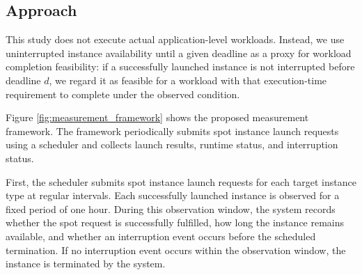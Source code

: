 \documentclass[runningheads]{llncs}
\begin{document}


\subsection{Approach}

This study does not execute actual application-level workloads. Instead, we use uninterrupted instance availability until a given deadline as a proxy for workload completion feasibility: if a successfully launched instance is not interrupted before deadline $d$, we regard it as feasible for a workload with that execution-time requirement to complete under the observed condition.

Figure \ref{fig:measurement_framework} shows the proposed measurement framework. The framework periodically submits spot instance launch requests using a scheduler and collects launch results, runtime status, and interruption status.

First, the scheduler submits spot instance launch requests for each target instance type at regular intervals. Each successfully launched instance is observed for a fixed period of one hour. During this observation window, the system records whether the spot request is successfully fulfilled, how long the instance remains available, and whether an interruption event occurs before the scheduled termination. If no interruption event occurs within the observation window, the instance is terminated by the system.
\end{document}
